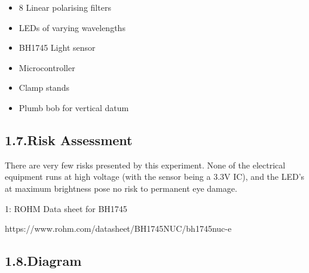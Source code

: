 \documentclass{article}
\begin{document}
\begin{itemize}[noitemsep,topsep=\mdcompacttopsep]%

\item{}8 Linear polarising filters%

\item{}LEDs of varying wavelengths%

\item{}BH1745 Light sensor%

\item{}Microcontroller%

\item{}Clamp stands%

\item{}Plumb bob for vertical datum%
\end{itemize}%

\subsection{1.7.\hspace*{0.5em}Risk Assessment}\label{sec-risk-assessment}%

\noindent{}There are very few risks presented by this experiment. None of the electrical equipment runs at high voltage (with the sensor being a 3.3V IC), and the LED's at maximum brightness pose no risk to permanent eye damage.%

{%
\begin{thebibliography}{0}%
\label{sec-bibliography}%

\mdbibitemlabel{}1: ROHM Data sheet for BH1745

https://www.rohm.com/datasheet/BH1745NUC/bh1745nuc-e%
\label{sensor}%
\par%
\end{thebibliography}}%

\subsection{1.8.\hspace*{0.5em}Diagram}\label{sec-diagram}%
\end{document}
